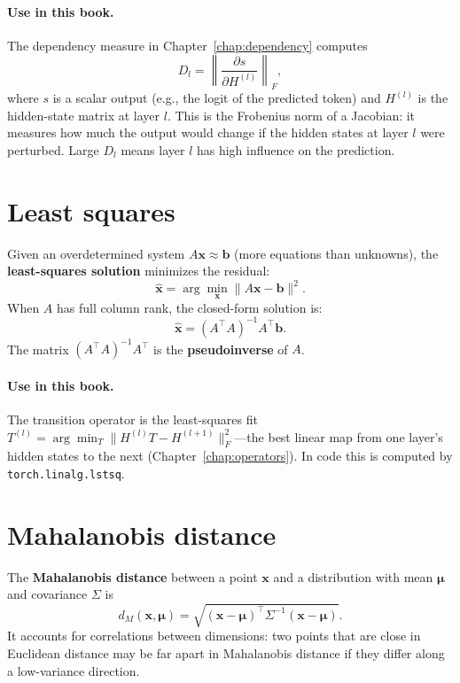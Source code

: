 \documentclass[11pt, twoside, openright]{memoir}
\begin{document}
\paragraph{Use in this book.}
The dependency measure in Chapter~\ref{chap:dependency} computes
\[
  D_l = \left\|\frac{\partial s}{\partial H^{(l)}}\right\|_F,
\]
where $s$ is a scalar output (e.g., the logit of the predicted token) and
$H^{(l)}$ is the hidden-state matrix at layer $l$.  This is the Frobenius
norm of a Jacobian: it measures how much the output would change if the
hidden states at layer $l$ were perturbed.  Large $D_l$ means layer $l$
has high influence on the prediction.

\section{Least squares}

Given an overdetermined system $A\mathbf{x} \approx \mathbf{b}$ (more
equations than unknowns), the \textbf{least-squares solution} minimizes the
residual:
\[
  \hat{\mathbf{x}} = \arg\min_{\mathbf{x}} \|A\mathbf{x} - \mathbf{b}\|^2.
\]
When $A$ has full column rank, the closed-form solution is:
\[
  \hat{\mathbf{x}} = (A^\top A)^{-1} A^\top \mathbf{b}.
\]
The matrix $(A^\top A)^{-1} A^\top$ is the \textbf{pseudoinverse} of $A$.

\paragraph{Use in this book.}
The transition operator is the least-squares fit
$T^{(l)} = \arg\min_T \|H^{(l)}T - H^{(l+1)}\|_F^2$---the best linear
map from one layer's hidden states to the next
(Chapter~\ref{chap:operators}).  In code this is computed by
\texttt{torch.linalg.lstsq}.

\section{Mahalanobis distance}
\label{sec:mahalanobis}

The \textbf{Mahalanobis distance} between a point $\mathbf{x}$ and a
distribution with mean $\boldsymbol{\mu}$ and covariance $\Sigma$ is
\[
  d_M(\mathbf{x}, \boldsymbol{\mu}) =
  \sqrt{(\mathbf{x} - \boldsymbol{\mu})^\top \Sigma^{-1}
  (\mathbf{x} - \boldsymbol{\mu})}.
\]
It accounts for correlations between dimensions: two points that are close
in Euclidean distance may be far apart in Mahalanobis distance if they
differ along a low-variance direction.
\end{document}
